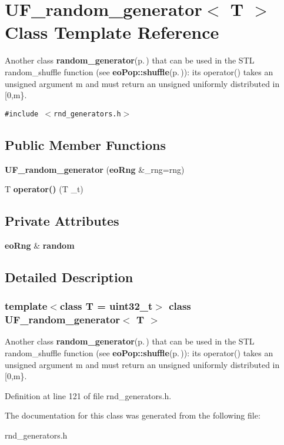 \section{UF\_\-random\_\-generator$<$ T $>$ Class Template Reference}
\label{class_u_f__random__generator}
Another class {\bf random\_\-generator}{\rm (p.\,\pageref{classrandom__generator})} that can be used in the STL random\_\-shuffle function (see {\bf eo\-Pop::shuffle}{\rm (p.\,\pageref{classeo_pop_a7})}): its operator() takes an unsigned argument m and must return an unsigned uniformly distributed in [0,m\}.  


{\tt \#include $<$rnd\_\-generators.h$>$}

\subsection*{Public Member Functions}
\begin{CompactItemize}
\item 
{\bf UF\_\-random\_\-generator} ({\bf eo\-Rng} \&\_\-rng=rng)\label{class_u_f__random__generator_a0}

\item 
T {\bf operator()} (T \_\-t)\label{class_u_f__random__generator_a1}

\end{CompactItemize}
\subsection*{Private Attributes}
\begin{CompactItemize}
\item 
{\bf eo\-Rng} \& {\bf random}\label{class_u_f__random__generator_r0}

\end{CompactItemize}


\subsection{Detailed Description}
\subsubsection*{template$<$class T = uint32\_\-t$>$ class UF\_\-random\_\-generator$<$ T $>$}

Another class {\bf random\_\-generator}{\rm (p.\,\pageref{classrandom__generator})} that can be used in the STL random\_\-shuffle function (see {\bf eo\-Pop::shuffle}{\rm (p.\,\pageref{classeo_pop_a7})}): its operator() takes an unsigned argument m and must return an unsigned uniformly distributed in [0,m\}. 



Definition at line 121 of file rnd\_\-generators.h.

The documentation for this class was generated from the following file:\begin{CompactItemize}
\item 
rnd\_\-generators.h\end{CompactItemize}
